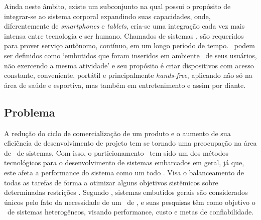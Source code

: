 	Ainda neste âmbito, existe um subconjunto na qual possui o propósito de integrar-se ao sistema corporal expandindo suas capacidades, onde, diferentemente de \textit{smartphones} e \textit{tablets}, cria-se uma integração cada vez mais intensa entre tecnologia e ser humano.
	Chamados de sistemas \wearables, são requeridos para prover serviço autônomo, contínuo, em um longo período de tempo.
	\Wearables\ podem ser definidos como `embutidos que foram inseridos em ambiente \mobile\ de seus usuários, não exercendo a mesma atividade' e seu propósito é criar dispositivos com acesso constante, conveniente, portátil e principalmente \textit{hands-free}, aplicando não só na área de saúde e esportiva, mas também em entretenimento e assim por diante.

   \subsection{Problema}
   	A redução do ciclo de comercialização de um produto e o aumento de sua eficiência de desenvolvimento de projeto tem se tornado uma preocupação na área de \design\ de sistemas.
   	Com isso, o particionamento \hs\ tem sido um dos métodos tecnológicos para o desenvolvimento de sistemas embarcados em geral, já que, este afeta a performance do sistema como um todo \cite{Hassine2017}.
      Visa o balanceamento de todas as tarefas de forma a otimizar alguns objetivos sistêmicos sobre determinadas restrições \cite{Hidalgo1997}.
   	Segundo \cite{Wolf1994, Edwards1994}, sistemas embutidos gerais são considerados únicos pelo fato da necessidade de um \codesign\ de \hs, e suas pesquisas têm como objetivo o \design\ de sistemas heterogêneos, visando performance, custo e metas de confiabilidade.


